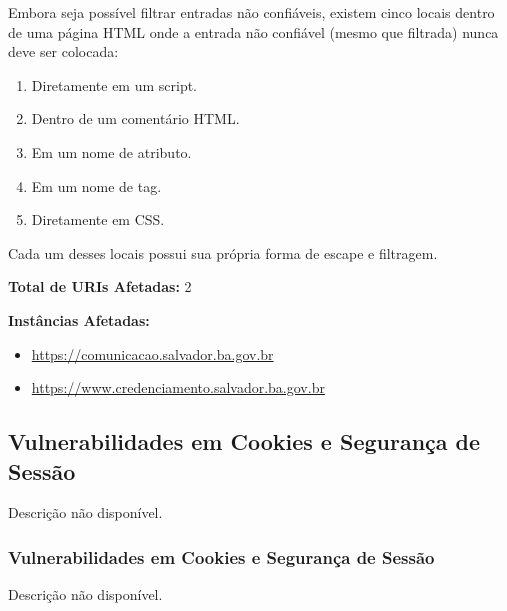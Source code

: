 \documentclass[a4paper,12pt]{article}
\begin{document}
\begin{enumerate}
Embora seja possível filtrar entradas não confiáveis, existem cinco locais dentro de uma página HTML onde a entrada não confiável (mesmo que filtrada) nunca deve ser colocada:
\begin{enumerate}
    \item Diretamente em um script.
    \item Dentro de um comentário HTML.
    \item Em um nome de atributo.
    \item Em um nome de tag.
    \item Diretamente em CSS.
\end{enumerate}
Cada um desses locais possui sua própria forma de escape e filtragem.

\textbf{Total de URIs Afetadas:} 2

\textbf{Instâncias Afetadas:}
\begin{itemize}
    \item \url{https://comunicacao.salvador.ba.gov.br}
    \item \url{https://www.credenciamento.salvador.ba.gov.br}
\end{itemize}

\end{enumerate}
\subsection{Vulnerabilidades em Cookies e Segurança de Sessão}
Descrição não disponível.

\subsubsection{Vulnerabilidades em Cookies e Segurança de Sessão}
Descrição não disponível.
\end{document}
